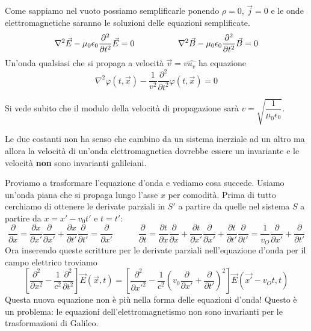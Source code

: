 \documentclass[12pt,a4paper,titlepage, twoside, openright]{book}
\numberwithin{equation}{chapter}
\begin{document}
Come sappiamo nel vuoto possiamo semplificarle ponendo $\rho=0$, $\vec{j}=0$ e le onde elettromagnetiche saranno le soluzioni delle equazioni semplificate. 
\begin{equation}
\nabla^2 \vec{E} -\mu_0\epsilon_0\dfrac{\partial^2}{\partial t^2}\vec{E}=0 \hspace{0.15\linewidth} \nabla^2 \vec{B} -\mu_0\epsilon_0\dfrac{\partial^2}{\partial t^2}\vec{B}=0
\end{equation}
Un'onda qualsiasi che si propaga a velocità $\vec{v}=v \hat{u_v}$ ha equazione
\begin{equation}
\nabla^2 \varphi(t,\vec{x}) -\dfrac{1}{v^2}\dfrac{\partial^2}{\partial t^2}\varphi(t,\vec{x})=0
\end{equation}

Si vede subito che il modulo della velocità di propagazione sarà $v=\sqrt{\dfrac{1}{\mu_0\epsilon_0}}$. 

Le due costanti non ha senso che cambino da un sistema inerziale ad un altro ma allora la velocità di un'onda elettromagnetica dovrebbe essere un invariante e le velocità \textbf{non} sono invarianti galileiani.

Proviamo a trasformare l'equazione d'onda e vediamo cosa succede. Usiamo un'onda piana che si propaga lungo l'asse $x$ per comodità.
Prima di tutto cerchiamo di ottenere le derivate parziali\footnotemark{}  in $S'$ a partire da quelle nel sistema $S$ a partire da $x=x'-v_0t'$ e $t=t'$:
\[
\dfrac{\partial}{\partial x}=
\dfrac{\partial x}{\partial x'}\dfrac{\partial}{\partial x'}+\dfrac{\partial x}{\partial t'}\dfrac{\partial }{\partial t'}
= \dfrac{\partial}{\partial x'} 
\qquad\quad
\dfrac{\partial}{\partial t}=\dfrac{\partial t}{\partial x}\dfrac{\partial}{\partial x}+\dfrac{\partial t}{\partial x'}\dfrac{\partial }{\partial x'}+\dfrac{\partial t}{\partial t'}\dfrac{\partial}{\partial t'}
=\dfrac{1}{v_O}\dfrac{\partial}{\partial x'}+\dfrac{\partial}{\partial t'}
\]
Ora inserendo queste scritture per le derivate parziali nell'equazione d'onda per il campo elettrico troviamo
\[
\left[ \dfrac{\partial^2}{\partial x^2}-\dfrac{1}{c^2}\dfrac{\partial^2}{\partial t^2} \right] \vec{E}(\vec{x},t)=
\left[ \dfrac{\partial^2}{\partial x'^2}-\dfrac{1}{c^2}\left( v_0 \dfrac{\partial}{\partial x'} + \dfrac{\partial}{\partial t'}\right)^2 \right] \vec{E}(\vec{x'}-v_Ot,t)
\]
Questa nuova equazione non è più nella forma delle equazioni d'onda! Questo è un problema: le equazioni dell'elettromagnetismo non sono invarianti per le trasformazioni di Galileo.
\end{document}
